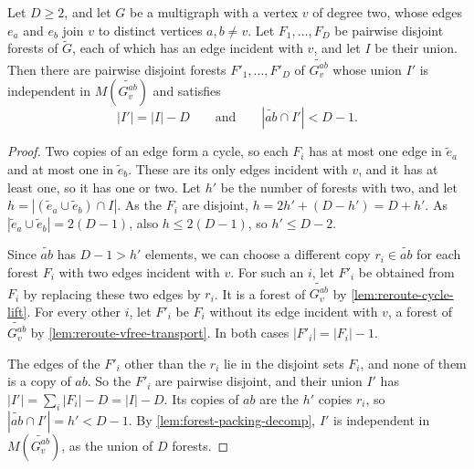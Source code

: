 \begin{lemma}
  \label{lem:forest-surgery-count}
  \leanok
  Let $D \ge 2$, and let $G$ be a multigraph with a vertex $v$ of degree
  two, whose edges $e_a$ and $e_b$ join $v$ to distinct vertices
  $a, b \neq v$. Let $F_1, \dots, F_D$ be pairwise disjoint forests of
  $\tilde G$, each of which has an edge incident with $v$, and let $I$ be
  their union. Then there are pairwise disjoint forests
  $F'_1, \dots, F'_D$ of $\widetilde{G_v^{ab}}$ whose union $I'$ is
  independent in $M(\widetilde{G_v^{ab}})$ and satisfies
  \[
    |I'| = |I| - D \qquad\text{and}\qquad
    |\widetilde{ab} \cap I'| < D - 1.
  \]
\end{lemma}
\begin{proof}
  \leanok
  Two copies of an edge form a cycle, so each $F_i$ has at most one edge
  in $\tilde e_a$ and at most one in $\tilde e_b$. These are its only
  edges incident with $v$, and it has at least one, so it has one or two.
  Let $h'$ be the number of forests with two, and let
  $h = |(\tilde e_a \cup \tilde e_b) \cap I|$. As the $F_i$ are disjoint,
  $h = 2h' + (D - h') = D + h'$. As
  $|\tilde e_a \cup \tilde e_b| = 2(D - 1)$, also $h \le 2(D - 1)$, so
  $h' \le D - 2$.

  Since $\widetilde{ab}$ has $D - 1 > h'$ elements, we can choose a
  different copy $r_i \in \widetilde{ab}$ for each forest $F_i$ with two
  edges incident with $v$. For such an $i$, let $F'_i$ be obtained from
  $F_i$ by replacing these two edges by $r_i$. It is a forest of
  $\widetilde{G_v^{ab}}$ by \cref{lem:reroute-cycle-lift}. For every
  other $i$, let $F'_i$ be $F_i$ without its edge incident with $v$, a
  forest of $\widetilde{G_v^{ab}}$ by \cref{lem:reroute-vfree-transport}.
  In both cases $|F'_i| = |F_i| - 1$.

  The edges of the $F'_i$ other than the $r_i$ lie in the disjoint sets
  $F_i$, and none of them is a copy of $ab$. So the $F'_i$ are pairwise
  disjoint, and their union $I'$ has
  $|I'| = \sum_i |F_i| - D = |I| - D$. Its copies of $ab$ are the $h'$
  copies $r_i$, so $|\widetilde{ab} \cap I'| = h' < D - 1$. By
  \cref{lem:forest-packing-decomp}, $I'$ is independent in
  $M(\widetilde{G_v^{ab}})$, as the union of $D$ forests.
\end{proof}


